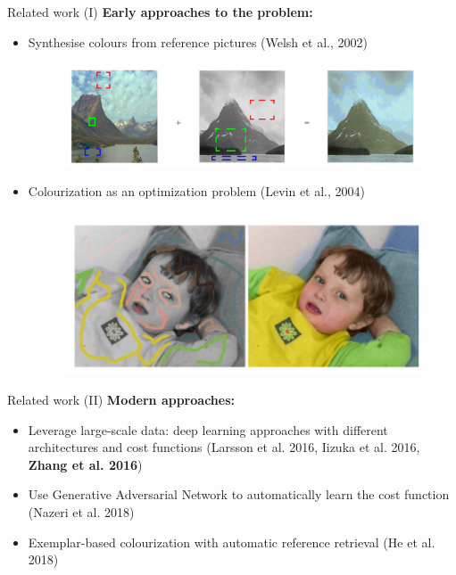 \documentclass{beamer}
\begin{document}
\begin{frame}{Related work (I)}
  \textbf{Early approaches to the problem:}

    \medskip

    \begin{itemize}
      \item Synthesise colours from reference pictures (Welsh et al., 2002)

      \begin{figure}[!htb]
          \includegraphics[width=\linewidth]{resources/welsh.jpg}
        \endminipage
      \end{figure}

      \medskip

      \item Colourization as an optimization problem (Levin et al., 2004)

      \begin{figure}[!htb]
          \includegraphics[width=\linewidth]{resources/levin.jpg}
        \endminipage
      \end{figure}
    \end{itemize}
\end{frame}

\begin{frame}{Related work (II)}
  \textbf{Modern approaches:}
    \begin{itemize}
      \item Leverage large-scale data: deep learning approaches with different
            architectures and cost functions (Larsson et al. 2016,
            Iizuka et al. 2016, \textbf{Zhang et al. 2016})
      \item Use Generative Adversarial Network to automatically learn the cost
            function (Nazeri et al. 2018)
      \item Exemplar-based colourization with automatic reference retrieval
            (He et al. 2018)
    \end{itemize}
\end{frame}
\end{document}
